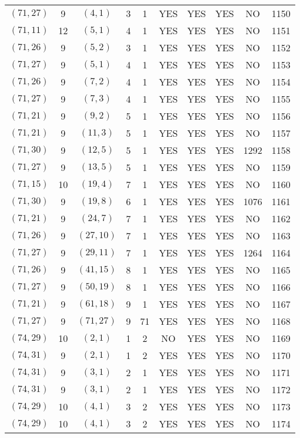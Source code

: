 \begin{longtable}{|c|c|c|c|c|c|c|c|c|c|}
$(71, 27)$ & 9 & $(4, 1)$ & 3 & 1 & YES & YES & YES & NO & 1150\\
$(71, 11)$ & 12 & $(5, 1)$ & 4 & 1 & YES & YES & YES & NO & 1151\\
$(71, 26)$ & 9 & $(5, 2)$ & 3 & 1 & YES & YES & YES & NO & 1152\\
$(71, 27)$ & 9 & $(5, 1)$ & 4 & 1 & YES & YES & YES & NO & 1153\\
$(71, 26)$ & 9 & $(7, 2)$ & 4 & 1 & YES & YES & YES & NO & 1154\\
$(71, 27)$ & 9 & $(7, 3)$ & 4 & 1 & YES & YES & YES & NO & 1155\\
$(71, 21)$ & 9 & $(9, 2)$ & 5 & 1 & YES & YES & YES & NO & 1156\\
$(71, 21)$ & 9 & $(11, 3)$ & 5 & 1 & YES & YES & YES & NO & 1157\\
$(71, 30)$ & 9 & $(12, 5)$ & 5 & 1 & YES & YES & YES & 1292 & 1158\\
$(71, 27)$ & 9 & $(13, 5)$ & 5 & 1 & YES & YES & YES & NO & 1159\\
$(71, 15)$ & 10 & $(19, 4)$ & 7 & 1 & YES & YES & YES & NO & 1160\\
$(71, 30)$ & 9 & $(19, 8)$ & 6 & 1 & YES & YES & YES & 1076 & 1161\\
$(71, 21)$ & 9 & $(24, 7)$ & 7 & 1 & YES & YES & YES & NO & 1162\\
$(71, 26)$ & 9 & $(27, 10)$ & 7 & 1 & YES & YES & YES & NO & 1163\\
$(71, 27)$ & 9 & $(29, 11)$ & 7 & 1 & YES & YES & YES & 1264 & 1164\\
$(71, 26)$ & 9 & $(41, 15)$ & 8 & 1 & YES & YES & YES & NO & 1165\\
$(71, 27)$ & 9 & $(50, 19)$ & 8 & 1 & YES & YES & YES & NO & 1166\\
$(71, 21)$ & 9 & $(61, 18)$ & 9 & 1 & YES & YES & YES & NO & 1167\\
$(71, 27)$ & 9 & $(71, 27)$ & 9 & 71 & YES & YES & YES & NO & 1168\\
$(74, 29)$ & 10 & $(2, 1)$ & 1 & 2 & NO & YES & YES & NO & 1169\\
$(74, 31)$ & 9 & $(2, 1)$ & 1 & 2 & YES & YES & YES & NO & 1170\\
$(74, 31)$ & 9 & $(3, 1)$ & 2 & 1 & YES & YES & YES & NO & 1171\\
$(74, 31)$ & 9 & $(3, 1)$ & 2 & 1 & YES & YES & YES & NO & 1172\\
$(74, 29)$ & 10 & $(4, 1)$ & 3 & 2 & YES & YES & YES & NO & 1173\\
$(74, 29)$ & 10 & $(4, 1)$ & 3 & 2 & YES & YES & YES & NO & 1174\\

\end{longtable}

